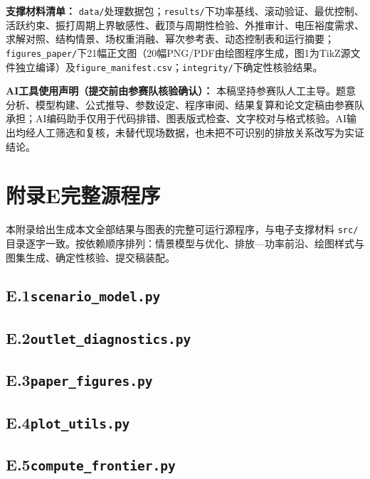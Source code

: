 \documentclass[UTF8,zihao=5,a4paper]{ctexart}
\begin{document}
\textbf{支撑材料清单：} \texttt{data/}处理数据包；\texttt{results/}下功率基线、滚动验证、最优控制、活跃约束、振打周期上界敏感性、截顶与周期性检验、外推审计、电压裕度需求、求解对照、结构情景、场权重消融、幂次参考表、动态控制表和运行摘要；\texttt{figures\_paper/}下21幅正文图（20幅PNG/PDF由绘图程序生成，图1为TikZ源文件独立编译）及\texttt{figure\_manifest.csv}；\texttt{integrity/}下确定性核验结果。

\textbf{AI工具使用声明（提交前由参赛队核验确认）：} 本稿坚持参赛队人工主导。题意分析、模型构建、公式推导、参数设定、程序审阅、结果复算和论文定稿由参赛队承担；AI编码助手仅用于代码排错、图表版式检查、文字校对与格式核验。AI输出均经人工筛选和复核，未替代现场数据，也未把不可识别的排放关系改写为实证结论。
\clearpage
\section*{附录E\quad 完整源程序}
本附录给出生成本文全部结果与图表的完整可运行源程序，与电子支撑材料 \texttt{src/} 目录逐字一致。按依赖顺序排列：情景模型与优化、排放—功率前沿、绘图样式与图集生成、确定性核验、提交稿装配。
\subsection*{E.1\quad \texttt{scenario\_model.py}}

\subsection*{E.2\quad \texttt{outlet\_diagnostics.py}}

\subsection*{E.3\quad \texttt{paper\_figures.py}}

\subsection*{E.4\quad \texttt{plot\_utils.py}}

\subsection*{E.5\quad \texttt{compute\_frontier.py}}

\end{document}
